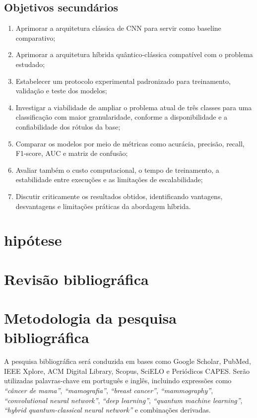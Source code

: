 \documentclass[
    12pt,
    openright,
    oneside,
    a4paper,
    english,
    brazil
]{abntex2}
\begin{document}
\section{Objetivos secundários}
\label{subsec:objetivos_secundarios}

\begin{enumerate}
    \item Aprimorar a arquitetura clássica de CNN para servir como baseline comparativo;
    \item Aprimorar a arquitetura híbrida quântico-clássica compatível com o problema estudado;
    \item Estabelecer um protocolo experimental padronizado para treinamento, validação e teste dos modelos;
    \item Investigar a viabilidade de ampliar o problema atual de três classes para uma classificação com maior granularidade, conforme a disponibilidade e a confiabilidade dos rótulos da base;
    \item Comparar os modelos por meio de métricas como acurácia, precisão, recall, F1-score, AUC e matriz de confusão;
    \item Avaliar também o custo computacional, o tempo de treinamento, a estabilidade entre execuções e as limitações de escalabilidade;
    \item Discutir criticamente os resultados obtidos, identificando vantagens, desvantagens e limitações práticas da abordagem híbrida.
\end{enumerate}


\chapter{hipótese}




\chapter{Revisão bibliográfica}

\chapter{Metodologia da pesquisa bibliográfica}
\label{sec:metodologia_biblio}

A pesquisa bibliográfica será conduzida em bases como Google Scholar, PubMed, IEEE Xplore, ACM Digital Library, Scopus, SciELO e Periódicos CAPES. Serão utilizadas palavras-chave em português e inglês, incluindo expressões como \textit{``câncer de mama''}, \textit{``mamografia''}, \textit{``breast cancer''}, \textit{``mammography''}, \textit{``convolutional neural network''}, \textit{``deep learning''}, \textit{``quantum machine learning''}, \textit{``hybrid quantum-classical neural network''} e combinações derivadas.
\end{document}
